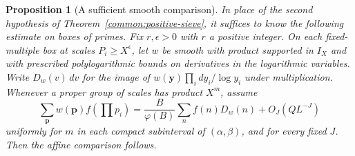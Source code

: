 \documentclass[11pt,a4paper]{article}
\theoremstyle{paperplain}
\newtheorem{proposition}[theorem]{Proposition}
\numberwithin{equation}{section}
\begin{document}
\begin{proposition}[A sufficient smooth comparison]\label{common:box-transfer}
In place of the second hypothesis of Theorem~\ref{common:positive-sieve},
it suffices to know the following estimate on boxes of primes. Fix
$r,\epsilon>0$ with $r$ a positive integer. On each fixed-multiple box
at scales $P_i\ge X^\epsilon$, let $w$ be smooth with product supported
in $I_X$ and with prescribed polylogarithmic bounds on derivatives in
the logarithmic variables. Write $D_w(v)\,dv$ for the image of
$w(\boldsymbol y)\prod_i dy_i/\log y_i$ under multiplication.
Whenever a proper group of scales has product $X^m$, assume
\[
 \sum_{\boldsymbol p} w(\boldsymbol p) f(\textstyle\prod p_i)
 =\frac B{\varphi(B)}\sum_n f(n)D_w(n)+O_J(QL^{-J})
\]
uniformly for $m$ in each compact subinterval of $(\alpha,\beta)$,
and for every fixed $J$. Then the affine comparison follows.
\end{proposition}
\end{document}
